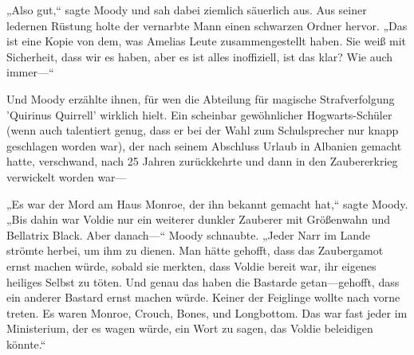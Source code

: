 „Also gut,“ sagte Moody und sah dabei ziemlich säuerlich aus. Aus seiner ledernen Rüstung holte der vernarbte Mann einen schwarzen Ordner hervor. „Das ist eine Kopie von dem, was Amelias Leute zusammengestellt haben. Sie weiß mit Sicherheit, dass wir es haben, aber es ist alles inoffiziell, ist das klar? Wie auch immer—“

Und Moody erzählte ihnen, für wen die Abteilung für magische Strafverfolgung 'Quirinus Quirrell' wirklich hielt. Ein scheinbar gewöhnlicher Hogwarts-Schüler (wenn auch talentiert genug, dass er bei der Wahl zum Schulsprecher nur knapp geschlagen worden war), der nach seinem Abschluss Urlaub in Albanien gemacht hatte, verschwand, nach 25 Jahren zurückkehrte und dann in den Zaubererkrieg verwickelt worden war—

„Es war der Mord am Haus Monroe, der ihn bekannt gemacht hat,“ sagte Moody. „Bis dahin war Voldie nur ein weiterer dunkler Zauberer mit Größenwahn und Bellatrix Black. Aber danach—“ Moody schnaubte. „Jeder Narr im Lande strömte herbei, um ihm zu dienen. Man hätte gehofft, dass das Zaubergamot ernst machen würde, sobald sie merkten, dass Voldie bereit war, ihr eigenes heiliges Selbst zu töten. Und genau das haben die Bastarde getan—gehofft, dass ein anderer Bastard ernst machen würde. Keiner der Feiglinge wollte nach vorne treten. Es waren Monroe, Crouch, Bones, und Longbottom. Das war fast jeder im Ministerium, der es wagen würde, ein Wort zu sagen, das Voldie beleidigen könnte.“

